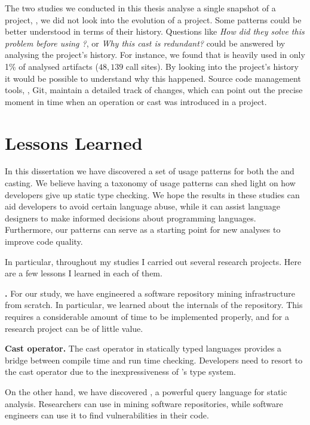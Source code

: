 The two studies we conducted in this thesis analyse a single snapshot of a project,
\ie{}, we did not look into the evolution of a project.
Some patterns could be better understood in terms of their history.
Questions like
\emph{How did they solve this problem before using \unsafe{}?},
or \emph{Why this cast is redundant?}
could be answered by analysing the project's history. 
For instance,
we found that \smu{} is heavily used in only 1\% of analysed artifacts
($48,139$ call sites).
By looking into the project's history it would be possible to understand why this happened.
Source code management tools, \eg{}, Git,
maintain a detailed track of changes,
which can point out the precise moment in time when an \unsafe{} operation or cast was introduced in a project.

\section{Lessons Learned}

In this dissertation we have discovered a set of usage patterns for both the \unsafe{} \api{} and casting.
We believe having a taxonomy of usage patterns can shed light on how \java{} developers give up static type checking.
We hope the results in these studies can aid developers to avoid certain language abuse,
while it can assist language designers to make informed decisions about programming languages.
Furthermore,
our patterns can serve as a starting point for new analyses to improve code quality.

In particular,
throughout my \phd{} studies I carried out several research projects.
Here are a few lessons I learned in each of them.

\textbf{\unsafe{} \api{}.}
For our \unsafe{} study,
we have engineered a software repository mining infrastructure from scratch.
In particular,
we learned about the internals of the \mavencentral{} repository.
This requires a considerable amount of time to be implemented properly,
and for a research project can be of little value.

\textbf{Cast operator.}
The cast operator in statically typed languages provides a bridge between compile time and run time checking.
Developers need to resort to the cast operator due to the inexpressiveness of \java{}'s type system. 

On the other hand, we have discovered \ql{},
a powerful query language for static analysis.
Researchers can use \ql{} in mining software repositories,
while software engineers can use it to find vulnerabilities in their code.

